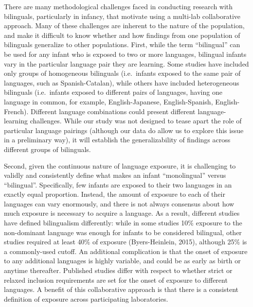 \documentclass[,man,floatsintext]{apa6}
\begin{document}
There are many methodological challenges faced in conducting research with bilinguals, particularly in infancy, that motivate using a multi-lab collaborative approach. Many of these challenges are inherent to the nature of the population, and make it difficult to know whether and how findings from one population of bilinguals generalize to other populations. First, while the term \enquote{bilingual} can be used for any infant who is exposed to two or more languages, bilingual infants vary in the particular language pair they are learning. Some studies have included only groups of homogeneous bilinguals (i.e.~infants exposed to the same pair of languages, such as Spanish-Catalan), while others have included heterogeneous bilinguals (i.e.~infants exposed to different pairs of languages, having one language in common, for example, English-Japanese, English-Spanish, English-French). Different language combinations could present different language-learning challenges. While our study was not designed to tease apart the role of particular language pairings (although our data do allow us to explore this issue in a preliminary way), it will establish the generalizability of findings across different groups of bilinguals.

Second, given the continuous nature of language exposure, it is challenging to validly and consistently define what makes an infant \enquote{monolingual} versus \enquote{bilingual}. Specifically, few infants are exposed to their two languages in an exactly equal proportion. Instead, the amount of exposure to each of their languages can vary enormously, and there is not always consensus about how much exposure is necessary to acquire a language. As a result, different studies have defined bilingualism differently: while in some studies 10\% exposure to the non-dominant language was enough for infants to be considered bilingual, other studies required at least 40\% of exposure (Byers-Heinlein, 2015), although 25\% is a commonly-used cutoff. An additional complication is that the onset of exposure to any additional languages is highly variable, and could be as early as birth or anytime thereafter. Published studies differ with respect to whether strict or relaxed inclusion requirements are set for the onset of exposure to different languages. A benefit of this collaborative approach is that there is a consistent definition of exposure across participating laboratories.
\end{document}
